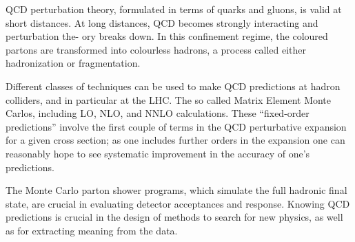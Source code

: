 QCD perturbation theory, formulated in terms of quarks and gluons, is valid at short
distances. At long distances, QCD becomes strongly interacting and perturbation the-
ory breaks down. In this confinement regime, the coloured partons are transformed into
colourless hadrons, a process called either hadronization or fragmentation. 


Different classes of techniques can be used to make QCD predictions at hadron colliders, and in particular at the LHC. 
The so called Matrix Element Monte Carlos, including LO, NLO, and NNLO calculations. These ``fixed-order predictions'' involve the first couple of terms in the QCD perturbative expansion for a given cross section; as one includes further orders in the expansion one can reasonably hope to see systematic improvement in the accuracy of one's predictions.

The Monte Carlo parton shower programs, which simulate the full hadronic final state, are crucial in evaluating detector acceptances and response.  
Knowing QCD predictions is crucial in the design of methods to search for new physics, as well as for extracting meaning from the data.

